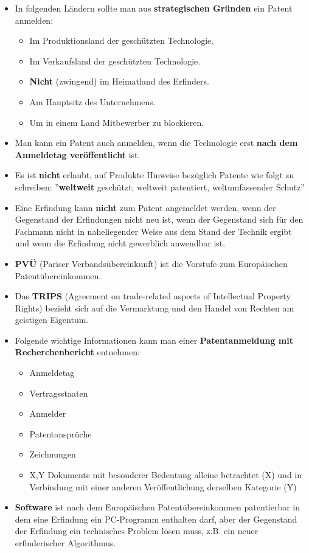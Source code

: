 \begin{itemize}
	\item In folgenden Ländern sollte man aus \textbf{strategischen Gründen} ein Patent anmelden:
	\begin{itemize}
		\item Im Produktionsland der geschützten Technologie.
		\item Im Verkaufsland der geschützten Technologie.
		\item \textbf{Nicht} (zwingend) im Heimatland des Erfinders.
		\item Am Hauptsitz des Unternehmens.
		\item Um in einem Land Mitbewerber zu blockieren.
	\end{itemize}
	\item Man kann ein Patent auch anmelden, wenn die Technologie erst \textbf{nach dem Anmeldetag veröffentlicht} ist.
	\item Es ist \textbf{nicht} erlaubt, auf Produkte Hinweise bezüglich Patente wie folgt zu schreiben: ''\textbf{weltweit} geschützt; weltweit patentiert, weltumfassender Schutz''
	\item Eine Erfindung kann \textbf{nicht} zum Patent angemeldet werden, wenn der Gegenstand der Erfindungen nicht neu ist, wenn der Gegenstand sich für den Fachmann nicht in naheliegender Weise aus dem Stand der Technik ergibt und wenn die Erfindung nicht gewerblich anwendbar ist.
	\item \textbf{PVÜ} (Pariser Verbandsübereinkunft) ist die Vorstufe zum Europäischen Patentübereinkommen.
	\item Das \textbf{TRIPS} (Agreement on trade-related aspects of Intellectual Property Rights) bezieht sich auf die Vermarktung und den Handel von Rechten am geistigen Eigentum.
	\item Folgende wichtige Informationen kann man einer \textbf{Patentanmeldung mit Recherchenbericht} entnehmen:
	\begin{itemize}
		\item Anmeldetag
		\item Vertragsstaaten
		\item Anmelder
		\item Patentansprüche
		\item Zeichnungen
		\item X,Y Dokumente mit besonderer Bedeutung alleine betrachtet (X) und in Verbindung mit einer anderen Veröffentlichung derselben Kategorie (Y)
	\end{itemize}
	\item \textbf{Software} ist nach dem Europäischen Patentübereinkommen patentierbar in dem eine Erfindung ein PC-Programm enthalten darf, aber der Gegenstand der Erfindung ein technisches Problem lösen muss, z.B. ein neuer erfinderischer Algorithmus.
\end{itemize}

